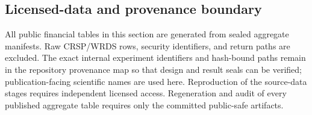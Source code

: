 \subsection{Licensed-data and provenance boundary}

All public financial tables in this section are generated from sealed
aggregate manifests. Raw CRSP/WRDS rows, security identifiers, and return paths
are excluded. The exact internal experiment identifiers and hash-bound paths
remain in the repository provenance map so that design and result seals can be
verified; publication-facing scientific names are used here. Reproduction of
the source-data stages requires independent licensed access. Regeneration and
audit of every published aggregate table requires only the committed
public-safe artifacts.
